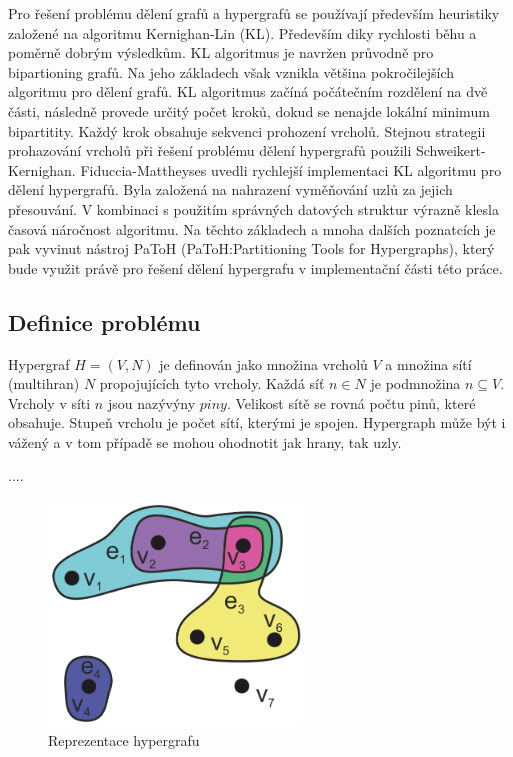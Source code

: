 \documentclass[thesis=M,czech]{FITthesis}[2012/06/26]
\begin{document}
Pro řešení problému dělení grafů a hypergrafů se používají především heuristiky založené na algoritmu Kernighan-Lin (KL). Především diky rychlosti běhu a poměrně dobrým výsledkům. KL algoritmus je navržen průvodně pro bipartioning grafů. Na jeho základech však vznikla většina pokročilejších algoritmu pro dělení grafů. KL algoritmus začíná počátečním rozdělení na dvě části, následně provede určitý počet kroků, dokud se nenajde lokální minimum bipartitity. Každý krok obsahuje sekvenci prohození vrcholů. Stejnou strategii prohazování vrcholů při řešení problému dělení hypergrafů použili Schweikert-Kernighan\cite{graph1}. Fiduccia-Mattheyses\cite{graph2} uvedli rychlejší implementaci KL algoritmu pro dělení hypergrafů. Byla založená na nahrazení vyměňování uzlů za jejich přesouvání.  V kombinaci s použitím správných datových struktur výrazně klesla časová náročnost algoritmu. Na těchto základech a mnoha dalších poznatcích je pak vyvinut nástroj PaToH (PaToH:Partitioning Tools for Hypergraphs), který bude využit právě pro řešení dělení hypergrafu v implementační části této práce.

\subsection{Definice problému}
Hypergraf $H=(V,N)$ je definován jako množina vrcholů $V$ a množina	sítí (multihran) $N$ propojujících tyto vrcholy. Každá síť $n \in N$ je podmnožina $n \subseteq V$. Vrcholy v síti $n$ jsou nazývýny $piny$. Velikost sítě se rovná počtu pinů, které obsahuje. Stupeň vrcholu je počet sítí, kterými je spojen. Hypergraph může být i vážený a v tom případě se mohou ohodnotit jak hrany, tak uzly.

....


\begin{figure}\centering
	\includegraphics[width=0.6\textwidth, angle=0]{files/Hypergraph.png}
	\caption[Reprezentace hypergrafu]{Reprezentace hypergrafu}\label{fig:hypergraph}
\end{figure}
\end{document}
